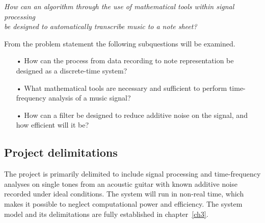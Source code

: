 \begin{center}
\textit{How can an algorithm through the use of mathematical tools within signal processing  \\
be designed to automatically transcribe music to a note sheet?}
\end{center}

From the problem statement the following subquestions will be examined.
\begin{itemize}
\item[•] How can the process from data recording to note representation be designed as a discrete-time system?
\item[•] What mathematical tools are necessary and sufficient to perform time-frequency analysis of a music signal?  
\item[•] How can a filter be designed to reduce additive noise on the signal, and how efficient will it be? 
\end{itemize}

\subsection{Project delimitations}
The project is primarily delimited to include signal processing and time-frequency analyses on single tones from an acoustic guitar with known additive noise recorded under ideal conditions. The system will run in non-real time, which makes it possible to neglect computational power and efficiency. The system model and its delimitations are fully established in chapter~\ref{ch3}.

